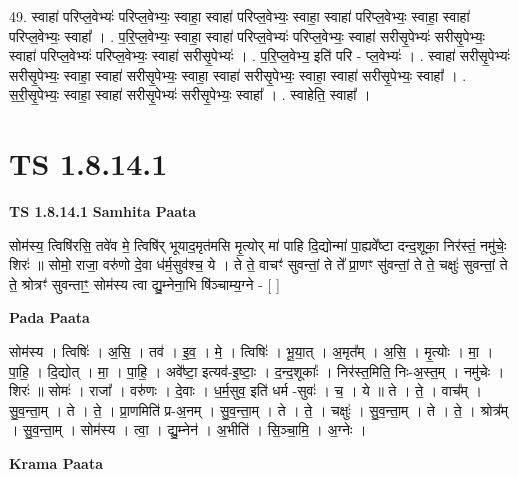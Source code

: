 \documentclass[17pt]{extarticle}
\begin{document}
49. स्वाहा॑ परिप्ल॒वेभ्यः॑ परिप्ल॒वेभ्यः॒ स्वाहा॒ स्वाहा॑ परिप्ल॒वेभ्यः॒ स्वाहा॒ स्वाहा॑ परिप्ल॒वेभ्यः॒ स्वाहा॒ स्वाहा॑ परिप्ल॒वेभ्यः॒ स्वाहा᳚ । . प॒रि॒प्ल॒वेभ्यः॒ स्वाहा॒ स्वाहा॑ परिप्ल॒वेभ्यः॑ परिप्ल॒वेभ्यः॒ स्वाहा॑ सरीसृ॒पेभ्यः॑ सरीसृ॒पेभ्यः॒ स्वाहा॑ परिप्ल॒वेभ्यः॑ परिप्ल॒वेभ्यः॒ स्वाहा॑ सरीसृ॒पेभ्यः॑ । . प॒रि॒प्ल॒वेभ्य॒ इति॑ परि - प्ल॒वेभ्यः॑ । . स्वाहा॑ सरीसृ॒पेभ्यः॑ सरीसृ॒पेभ्यः॒ स्वाहा॒ स्वाहा॑ सरीसृ॒पेभ्यः॒ स्वाहा॒ स्वाहा॑ सरीसृ॒पेभ्यः॒ स्वाहा॒ स्वाहा॑ सरीसृ॒पेभ्यः॒ स्वाहा᳚ । . स॒री॒सृ॒पेभ्यः॒ स्वाहा॒ स्वाहा॑ सरीसृ॒पेभ्यः॑ सरीसृ॒पेभ्यः॒ स्वाहा᳚ । . स्वाहेति॒ स्वाहा᳚ । \newline
\pagebreak
{}

\section{ TS 1.8.14.1 }

\textbf{TS 1.8.14.1 } \newline
\textbf{Samhita Paata} \newline

सोम॑स्य॒ त्विषि॑रसि॒ तवे॑व मे॒ त्विषि॑र् भूयाद॒मृत॑मसि मृ॒त्योर् मा॑ पाहि दि॒द्योन्मा॑ पा॒ह्यवे᳚ष्टा दन्द॒शूका॒ निर॑स्तं॒ नमु॑चेः॒ शिरः॑ ॥ सोमो॒ राजा॒ वरु॑णो दे॒वा ध॑र्म॒सुव॑श्च॒ ये । ते ते॒ वाचꣳ॑ सुवन्तां॒ ते ते᳚ प्रा॒णꣳ सु॑वन्तां॒ ते ते॒ चक्षुः॑ सुवन्तां॒ ते ते॒ श्रोत्रꣳ॑ सुवन्ताꣳ॒॒ सोम॑स्य त्वा द्यु॒म्नेना॒भि षि॑ञ्चाम्य॒ग्ने - [ ] \newline

\textbf{Pada Paata} \newline

सोम॑स्य । त्विषिः॑ । अ॒सि॒ । तव॑ । इ॒व॒ । मे॒ । त्विषिः॑ । भू॒या॒त् । अ॒मृत᳚म् । अ॒सि॒ । मृ॒त्योः । मा॒ । पा॒हि॒ । दि॒द्योत् । मा॒ । पा॒हि॒ । अवे᳚ष्टा॒ इत्यव॑-इ॒ष्टाः॒ । द॒न्द॒शूकाः᳚ । निर॑स्त॒मिति॒ निः-अ॒स्त॒म् । नमु॑चेः । शिरः॑ ॥ सोमः॑ । राजा᳚ । वरु॑णः । दे॒वाः । ध॒र्म॒सुव॒ इति॑ धर्म -सुवः॑ । च॒ । ये ॥ ते । ते॒ । वाच᳚म् । सु॒व॒न्ता॒म् । ते । ते॒ । प्रा॒णमिति॑ प्र-अ॒नम् । सु॒व॒न्ता॒म् । ते । ते॒ । चक्षुः॑ । सु॒व॒न्ता॒म् । ते । ते॒ । श्रोत्र᳚म् । सु॒व॒न्ता॒म् । सोम॑स्य । त्वा॒ । द्यु॒म्नेन॑ । अ॒भीति॑ । सि॒ञ्चा॒मि॒ । अ॒ग्नेः ।  \newline


\textbf{Krama Paata} \newline
\end{document}
